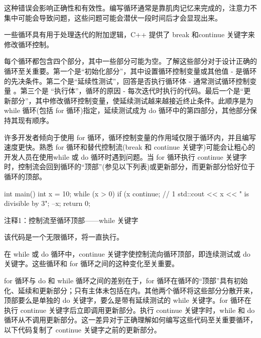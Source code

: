 这种错误会影响正确性和有效性。编写循环通常是靠肌肉记忆来完成的，注意力不集中可能会导致问题，这些问题可能会潜伏一段时间后才会显现出来。


一些循环具有用于处理迭代的附加逻辑，C++ 提供了 break 和continue 关键字来修改循环控制。

每个循环都包含四个部分，其中一些部分可能为空。了解这些部分对于设计正确的循环至关重要。第一个是“初始化部分”，其中设置循环控制变量或其他值 - 是循环的先决条件。第二个是“延续性测试”，回答是否执行循环体 - 通常测试循环控制变量 。第三个是 “执行体”，循环的原因 - 每次迭代时执行的代码。最后一个是“更新部分”，其中修改循环控制变量，使延续测试越来越接近终止条件。此顺序是为 while 循环(包括 for 循环)指定，延续测试成为 do 循环中的第四部分，其他部分保持其现有顺序。

许多开发者倾向于使用 for 循环，循环控制变量的作用域仅限于循环内，并且编写速度更快。熟悉 for 循环和替代控制流(break 和 continue 关键字)可能会让粗心的开发人员在使用while 或 do 循环时遇到问题。当 for 循环执行 continue 关键字时，控制流会回到循环的“顶部”(参见以下列表)或更新部分，而更新部分恰好位于循环的顶部。


\begin{cpp}
int main() {
  int x = 10;
  while (x > 0) {
    if (x %
      continue; // 1
    std::cout << x << " is divisible by 3\n";
    --x;
  }
  return 0;
}
\end{cpp}

{\footnotesize
注释1：控制流至循环顶部——while 关键字
}

该代码是一个无限循环，将一直执行。


在 while 或 do 循环中，continue 关键字使控制流向循环顶部，即连续测试或 do 关键字。这些循环和 for 循环之间的这种变化至关重要。


for 循环与 do 和 while 循环之间的差别在于，for 循环在循环的“顶部”具有初始化、延续和更新部分；只有主体未包括在内。其他两个循环将这些部分分散开来，顶部要么是单独的 do 关键字，要么是带有延续测试的 while 关键字。for 循环在执行 continue 关键字后立即调用更新部分。执行 continue 关键字时，while 和 do 循环从不调用更新部分。这一差异对于正确理解如何编写这些代码至关重要循环，以下代码复制了 continue 关键字之前的更新部分。


